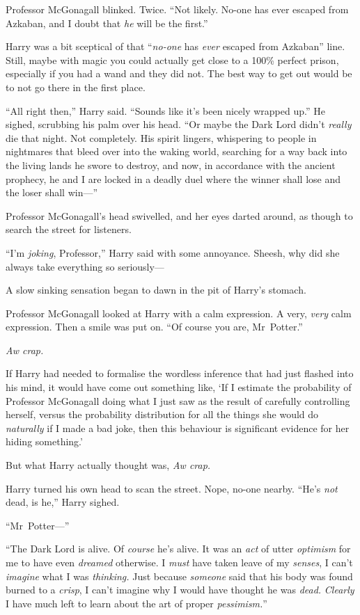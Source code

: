 Professor McGonagall blinked. Twice. “Not likely. No-one has ever escaped from Azkaban, and I doubt that \emph{he} will be the first.”

Harry was a bit sceptical of that “\emph{no-one} has \emph{ever} escaped from Azkaban” line. Still, maybe with magic you could actually get close to a 100\% perfect prison, especially if you had a wand and they did not. The best way to get out would be to not go there in the first place.

“All right then,” Harry said. “Sounds like it’s been nicely wrapped up.” He sighed, scrubbing his palm over his head. “Or maybe the Dark Lord didn’t \emph{really} die that night. Not completely. His spirit lingers, whispering to people in nightmares that bleed over into the waking world, searching for a way back into the living lands he swore to destroy, and now, in accordance with the ancient prophecy, he and I are locked in a deadly duel where the winner shall lose and the loser shall win—”

Professor McGonagall’s head swivelled, and her eyes darted around, as though to search the street for listeners.

“I’m \emph{joking}, Professor,” Harry said with some annoyance. Sheesh, why did she always take everything so seriously—

A slow sinking sensation began to dawn in the pit of Harry’s stomach.

Professor McGonagall looked at Harry with a calm expression. A very, \emph{very} calm expression. Then a smile was put on. “Of course you are, Mr~Potter.”

\emph{Aw crap.}

If Harry had needed to formalise the wordless inference that had just flashed into his mind, it would have come out something like, ‘If I estimate the probability of Professor McGonagall doing what I just saw as the result of carefully controlling herself, versus the probability distribution for all the things she would do \emph{naturally} if I made a bad joke, then this behaviour is significant evidence for her hiding something.’

But what Harry actually thought was, \emph{Aw crap.}

Harry turned his own head to scan the street. Nope, no-one nearby. “He’s \emph{not} dead, is he,” Harry sighed.

“Mr~Potter—”

“The Dark Lord is alive. Of \emph{course} he’s alive. It was an \emph{act} of utter \emph{optimism} for me to have even \emph{dreamed} otherwise. I \emph{must} have taken leave of my \emph{senses}, I can’t \emph{imagine} what I was \emph{thinking.} Just because \emph{someone} said that his body was found burned to a \emph{crisp}, I can’t imagine why I would have thought he was \emph{dead.} \emph{Clearly} I have much left to learn about the art of proper \emph{pessimism.}”

